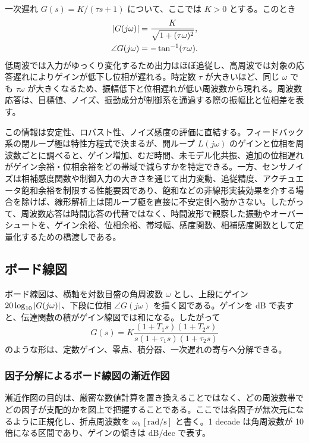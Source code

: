 一次遅れ $G(s)=K/(\tau s+1)$ について、ここでは $K>0$ とする。このとき
\begin{align}
  \left|G(j\omega)\right|&=\frac{K}{\sqrt{1+(\tau\omega)^2}},\\
  \angle G(j\omega)&=-\tan^{-1}(\tau\omega).
\end{align}
低周波では入力がゆっくり変化するため出力はほぼ追従し、高周波では対象の応答遅れによりゲインが低下し位相が遅れる。時定数 $\tau$ が大きいほど、同じ $\omega$ でも $\tau\omega$ が大きくなるため、振幅低下と位相遅れが低い周波数から現れる。周波数応答は、目標値、ノイズ、振動成分が制御系を通過する際の振幅比と位相差を表す。

この情報は安定性、ロバスト性、ノイズ感度の評価に直結する。フィードバック系の閉ループ極は特性方程式で決まるが、開ループ $L(j\omega)$ のゲインと位相を周波数ごとに調べると、ゲイン増加、むだ時間、未モデル化共振、追加の位相遅れがゲイン余裕・位相余裕をどの帯域で減らすかを特定できる。一方、センサノイズは相補感度関数や制御入力の大きさを通じて出力変動、追従精度、アクチュエータ飽和余裕を制限する性能要因であり、飽和などの非線形実装効果を介する場合を除けば、線形解析上は閉ループ極を直接に不安定側へ動かさない。したがって、周波数応答は時間応答の代替ではなく、時間波形で観察した振動やオーバーシュートを、ゲイン余裕、位相余裕、帯域幅、感度関数、相補感度関数として定量化するための橋渡しである。

\subsection{ボード線図}

ボード線図は、横軸を対数目盛の角周波数 $\omega$ とし、上段にゲイン $20\log_{10}\left|G(j\omega)\right|$、下段に位相 $\angle G(j\omega)$ を描く図である。ゲインを dB で表すと、伝達関数の積がゲイン線図では和になる。したがって
\begin{equation}
  G(s)=K\frac{(1+T_1s)(1+T_2s)}{s(1+\tau_1s)(1+\tau_2s)}
\end{equation}
のような形は、定数ゲイン、零点、積分器、一次遅れの寄与へ分解できる。

\subsubsection{因子分解によるボード線図の漸近作図}

漸近作図の目的は、厳密な数値計算を置き換えることではなく、どの周波数帯でどの因子が支配的かを図上で把握することである。ここでは各因子が無次元になるように正規化し、折点周波数を $\omega_b\,[\mathrm{rad/s}]$ と書く。1 decade は角周波数が 10 倍になる区間であり、ゲインの傾きは $\mathrm{dB/dec}$ で表す。

